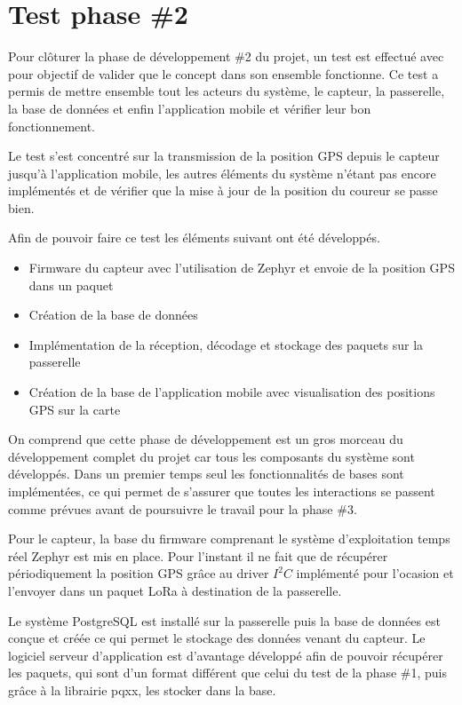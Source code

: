 
\chapter{Test phase \#2}\label{ch:test_2}

Pour clôturer la phase de développement \#2 du projet, un test est effectué avec pour objectif de valider que le concept dans son ensemble fonctionne. Ce test a permis de mettre ensemble tout les acteurs du système, le capteur, la passerelle, la base de données et enfin l'application mobile et vérifier leur bon fonctionnement.

Le test s'est concentré sur la transmission de la position GPS depuis le capteur jusqu'à l'application mobile, les autres éléments du système n'étant pas encore implémentés et de vérifier que la mise à jour de la position du coureur se passe bien.

Afin de pouvoir faire ce test les éléments suivant ont été développés.

\begin{itemize}
\item Firmware du capteur avec l'utilisation de Zephyr et envoie de la position GPS dans un paquet
\item Création de la base de données
\item Implémentation de la réception, décodage et stockage des paquets sur la passerelle
\item Création de la base de l'application mobile avec visualisation des positions GPS sur la carte
\end{itemize}

On comprend que cette phase de développement est un gros morceau du développement complet du projet car tous les composants du système sont développés. Dans un premier temps seul les fonctionnalités de bases sont implémentées, ce qui permet de s'assurer que toutes les interactions se passent comme prévues avant de poursuivre le travail pour la phase \#3.

Pour le capteur, la base du firmware comprenant le système d'exploitation temps réel Zephyr est mis en place. Pour l'instant il ne fait que de récupérer périodiquement la position GPS grâce au driver $I^{2}C$ implémenté pour l'ocasion et l'envoyer dans un paquet LoRa à destination de la passerelle.

Le système PostgreSQL est installé sur la passerelle puis la base de données est conçue et créée ce qui permet le stockage des données venant du capteur. Le logiciel serveur d'application est d'avantage développé afin de pouvoir récupérer les paquets, qui sont d'un format différent que celui du test de la phase \#1, puis grâce à la librairie pqxx, les stocker dans la base.

